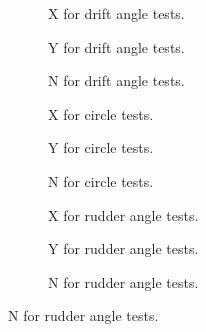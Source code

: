 \begin{figure}[H]
     \centering
     \begin{subfigure}[b]{0.32\textwidth}
         \centering
        
        \caption{X for drift angle tests.}
        \label{fig:drift_angle_X_wPCC}
     \end{subfigure}
     \hfill
     \begin{subfigure}[b]{0.32\textwidth}
         \centering
         
        \caption{Y for drift angle tests.}
        \label{fig:drift_angle_Y_wPCC}
     \end{subfigure}
     \hfill
     \begin{subfigure}[b]{0.32\textwidth}
         \centering
         
        \caption{N for drift angle tests.}
        \label{fig:drift_angle_N_wPCC}
     \end{subfigure}
    \vfill
    
     \begin{subfigure}[b]{0.32\textwidth}
         \centering
         
        \caption{X for circle tests.}
        \label{fig:circle_X_wPCC}
     \end{subfigure}
     \hfill
     \begin{subfigure}[b]{0.32\textwidth}
         \centering
         
        \caption{Y for circle tests.}
        \label{fig:circle_Y_wPCC}
     \end{subfigure}
     \hfill
     \begin{subfigure}[b]{0.32\textwidth}
         \centering
         
        \caption{N for circle tests.}
        \label{fig:circle_N_wPCC}
     \end{subfigure}

    \vfill
     \begin{subfigure}[b]{0.32\textwidth}
         \centering
         
        \caption{X for rudder angle tests.}
        \label{fig:rudder_angle_X_wPCC}
     \end{subfigure}
     \hfill
     \begin{subfigure}[b]{0.32\textwidth}
         \centering
         
        \caption{Y for rudder angle tests.}
        \label{fig:rudder_angle_Y_wPCC}
     \end{subfigure}
     \hfill
     \begin{subfigure}[b]{0.32\textwidth}
         \centering
         
        \caption{N for rudder angle tests.}
        \label{fig:rudder_angle_N_wPCC}
     \end{subfigure}


\end{figure}
